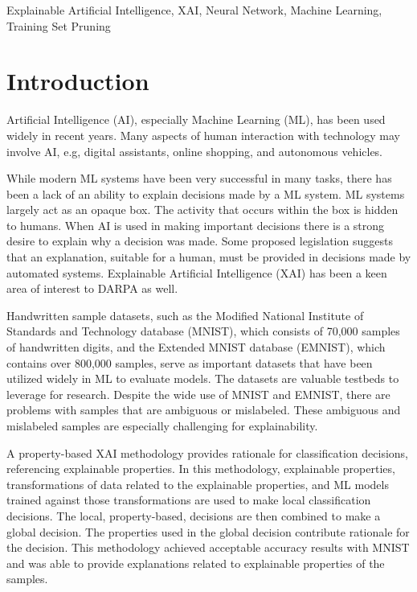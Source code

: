 \documentclass[conference]{IEEEtran}
\begin{document}
\begin{IEEEkeywords}
    Explainable Artificial Intelligence, XAI, Neural Network, Machine Learning, Training Set Pruning
\end{IEEEkeywords}

\section{Introduction}
Artificial Intelligence (AI), especially Machine Learning (ML), has been used
widely in recent years.  Many aspects of human interaction with technology may
involve AI, e.g, digital assistants, online shopping, and autonomous vehicles.

While modern ML systems have been very successful in many tasks, there has been
a lack of an ability to explain decisions made by a ML system. ML systems
largely act as an opaque box.  The activity that occurs within the box is hidden
to humans.  When AI is used in making important decisions there is a strong
desire to explain why a decision was made.  Some proposed legislation suggests
that an explanation, suitable for a human, must be provided in decisions made
by automated systems.  Explainable Artificial Intelligence (XAI) has been a keen
area of interest to DARPA\cite{Gunning_Aha_2019} as well.

Handwritten sample datasets, such as the Modified National Institute of
Standards and Technology database (MNIST)\cite{deng2012mnist}, which consists of
70,000 samples of handwritten digits, and the Extended MNIST database\cite{cohen2017emnist}
(EMNIST), which contains over 800,000 samples, serve as
important datasets that have been utilized widely in ML to evaluate models. The
datasets are valuable testbeds to leverage for research. Despite the wide use of
MNIST and EMNIST, there are problems with samples that are ambiguous or
mislabeled.  These ambiguous and mislabeled samples are especially challenging
for explainability.

A property-based XAI methodology\cite{whitten21} provides rationale for
classification decisions, referencing explainable properties.  In this
methodology, explainable properties, transformations of data related to the
explainable properties, and ML models trained against those transformations are
used to make local classification decisions.  The local, property-based,
decisions are then combined to make a global decision.  The properties used in
the global decision contribute rationale for the decision.  This methodology
achieved acceptable accuracy results with MNIST and was able to provide
explanations related to explainable properties of the samples.
\end{document}
